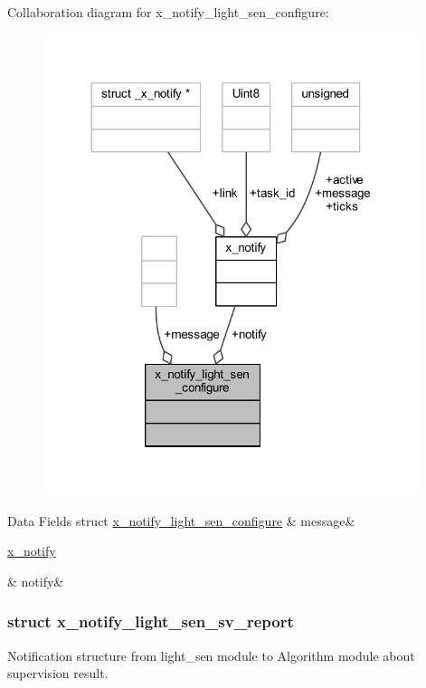 Collaboration diagram for x\+\_\+notify\+\_\+light\+\_\+sen\+\_\+configure\+:\nopagebreak
\begin{figure}[H]
\begin{center}
\leavevmode
\includegraphics[width=311pt]{de/db9/a00937}
\end{center}
\end{figure}
\begin{DoxyFields}{Data Fields}
\hypertarget{a00018_a32952acc732e2f16aad59fe0804da5bf}{struct \hyperlink{a00018_d0/d82/a00857}{x\+\_\+notify\+\_\+light\+\_\+sen\+\_\+configure}}\label{a00018_a32952acc732e2f16aad59fe0804da5bf}
&
message&
\\
\hline

\hypertarget{a00018_a8e6a04c2283f9fd7b8dcbc62faba5847}{\hyperlink{a00036_df/d4c/a00851}{x\+\_\+notify}}\label{a00018_a8e6a04c2283f9fd7b8dcbc62faba5847}
&
notify&
\\
\hline

\end{DoxyFields}
\label{d0/d66/a00858}
\hypertarget{a00018_d0/d66/a00858}{}
\subsubsection{struct x\+\_\+notify\+\_\+light\+\_\+sen\+\_\+sv\+\_\+report}
Notification structure from light\+\_\+sen module to Algorithm module about supervision result. 

